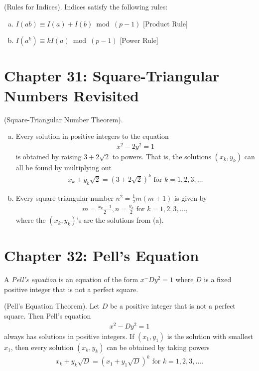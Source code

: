 \documentclass[graybox]{svmult}
\begin{document}
\begin{theorem}
(Rules for Indices). Indices satisfy the following rules:
\begin{enumerate}[(a)]
\item $I(ab)\equiv I(a) + I(b) \bmod (p-1)$ [Product Rule]
\item $I(a^k)\equiv kI(a) \bmod (p-1)$ [Power Rule]
\end{enumerate}
\end{theorem}

\section*{Chapter 31: Square-Triangular Numbers Revisited}

\begin{theorem}
(Square-Triangular Number Theorem).
\begin{enumerate}[(a)]
\item Every solution in positive integers to the equation
\begin{align*}
x^2-2y^2=1
\end{align*}
is obtained by raising $3+2\sqrt2$ to powers. That is, the solutions $(x_k,y_k)$ can all be found by multiplying out
\begin{align*}
x_k+y_k\sqrt2=(3+2\sqrt2)^k \text{ for } k=1, 2, 3, \ldots
\end{align*}
\item Every square-triangular number $n^2=\frac{1}{2}m(m+1)$ is given by
\begin{align*}
m = \frac{x_k-1}{2}, n = \frac{y_k}{2} \text{ for } k=1,2,3,\ldots,
\end{align*}
where the $(x_k, y_k)$'s are the solutions from (a).
\end{enumerate}
\end{theorem}

\section*{Chapter 32: Pell's Equation}

\begin{definition}
A \textit{Pell's equation} is an equation of the form $x^-Dy^2=1$ where $D$ is a fixed positive integer that is not a perfect square.
\end{definition}

\begin{svgraybox}
\begin{theorem}
(Pell's Equation Theorem). Let $D$ be a positive integer that is not a perfect square. Then Pell's equation
\begin{align*}
x^2-Dy^2=1
\end{align*}
always has solutions in positive integers. If $(x_1, y_1)$ is the solution with smallest $x_1$, then every solution $(x_k, y_k)$ can be obtained by taking powers
\begin{align*}
x_k+y_k\sqrt{D}=(x_1+y_1\sqrt{D})^k \text{ for } k = 1,2,3,\ldots.
\end{align*}
\end{theorem}
\end{svgraybox}
\end{document}
